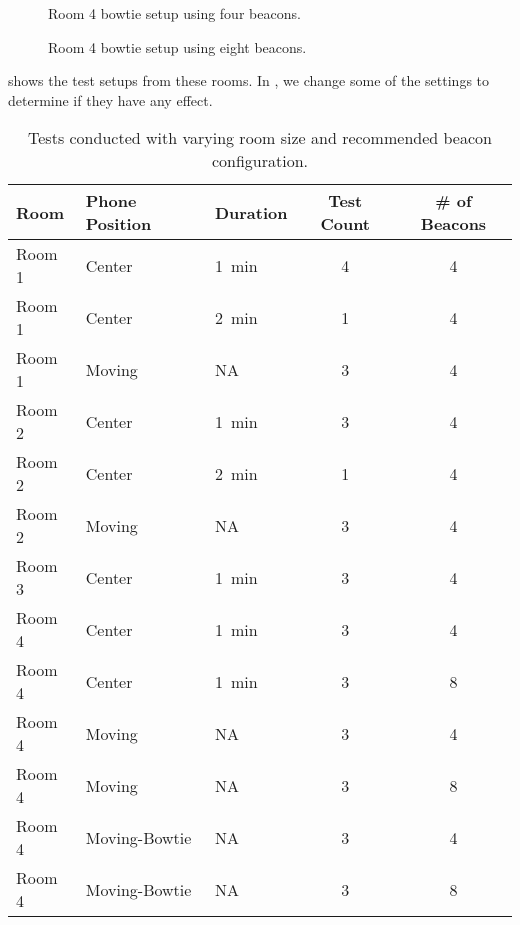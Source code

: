 \begin{figure}[!htb]
  \begin{minipage}[b]{0.45\textwidth}
    \centering
    
    \caption{Room 4 bowtie setup using four beacons.}
    \label{fig:bowtie4beacons}
  \end{minipage}\hfill
  \begin{minipage}[b]{0.45\textwidth}
    \centering
    
    \caption{Room 4 bowtie setup using eight beacons.}
    \label{fig:bowtie8beacons}
  \end{minipage}
\end{figure}

 shows the test setups from these rooms.
In , we change some of the settings to determine if they have any effect.

\begin{table}[!htb]
  \centering
  \begin{tabular}{l| l l c c}
    Room   & Phone Position & Duration 	       & Test Count & \# of Beacons \\ \hline
    Room 1 & Center         & \SI{1}{\minute}  & 4          & 4 \\ 
    Room 1 & Center         & \SI{2}{\minute}  & 1          & 4 \\ 
    Room 1 & Moving         & NA               & 3          & 4 \\
    Room 2 & Center         & \SI{1}{\minute}  & 3          & 4 \\ 
    Room 2 & Center         & \SI{2}{\minute}  & 1          & 4 \\
    Room 2 & Moving         & NA               & 3          & 4 \\ 
    Room 3 & Center         & \SI{1}{\minute}  & 3          & 4 \\ 
    Room 4 & Center         & \SI{1}{\minute}  & 3          & 4 \\ 
    Room 4 & Center         & \SI{1}{\minute}  & 3          & 8 \\ 
    Room 4 & Moving         & NA               & 3          & 4 \\
    Room 4 & Moving         & NA               & 3          & 8 \\
    Room 4 & Moving-Bowtie  & NA               & 3          & 4 \\
    Room 4 & Moving-Bowtie  & NA               & 3          & 8 \\
  \end{tabular}
  \caption{Tests conducted with varying room size and recommended beacon configuration.}
  \label{table:precisiontest:roomsize}
\end{table}


